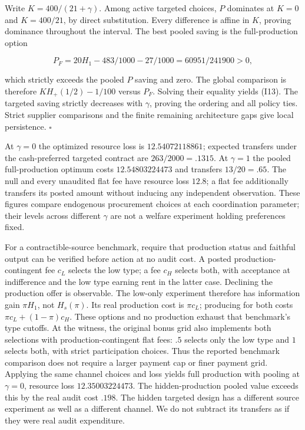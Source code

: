 \documentclass[
  11pt,
]{article}
\begin{document}
Write \(K=400/(21+\gamma)\). Among active targeted choices, \(P\)
dominates at \(K=0\) and \(K=400/21\), by direct substitution. Every
difference is affine in \(K\), proving dominance throughout the
interval. The best pooled saving is the full-production option

\[P_F=20H_1-483/1000-27/1000=60951/241900>0,\]

which strictly exceeds the pooled \(P\) saving and zero. The global
comparison is therefore \(K H_+(1/2)-1/100\) versus \(P_F\). Solving
their equality yields (I13). The targeted saving strictly decreases with
\(\gamma\), proving the ordering and all policy ties. Strict supplier
comparisons and the finite remaining architecture gaps give local
persistence. \(\square\)

At \(\gamma=0\) the optimized resource loss is \(12.54072118861\);
expected transfers under the cash-preferred targeted contract are
\(263/2000=.1315\). At \(\gamma=1\) the pooled full-production optimum
costs \(12.54803224473\) and transfers \(13/20=.65\). The null and every
unaudited flat fee have resource loss \(12.8\); a flat fee additionally
transfers its posted amount without inducing any independent
observation. These figures compare endogenous procurement choices at
each coordination parameter; their levels across different \(\gamma\)
are not a welfare experiment holding preferences fixed.

For a contractible-source benchmark, require that production status and
faithful output can be verified before action at no audit cost. A posted
production-contingent fee \(c_L\) selects the low type; a fee \(c_H\)
selects both, with acceptance at indifference and the low type earning
rent in the latter case. Declining the production offer is observable.
The low-only experiment therefore has information gain \(\pi H_1\), not
\(H_s(\pi)\). Its real production cost is \(\pi c_L\); producing for
both costs \(\pi c_L+(1-\pi)c_H\). These options and no production
exhaust that benchmark's type cutoffs. At the witness, the original
bonus grid also implements both selections with production-contingent
flat fees: \(.5\) selects only the low type and \(1\) selects both, with
strict participation choices. Thus the reported benchmark comparison
does not require a larger payment cap or finer payment grid. Applying
the same channel choices and loss yields full production with pooling at
\(\gamma=0\), resource loss \(12.35003224473\). The hidden-production
pooled value exceeds this by the real audit cost \(.198\). The hidden
targeted design has a different source experiment as well as a different
channel. We do not subtract its transfers as if they were real audit
expenditure.
\end{document}
